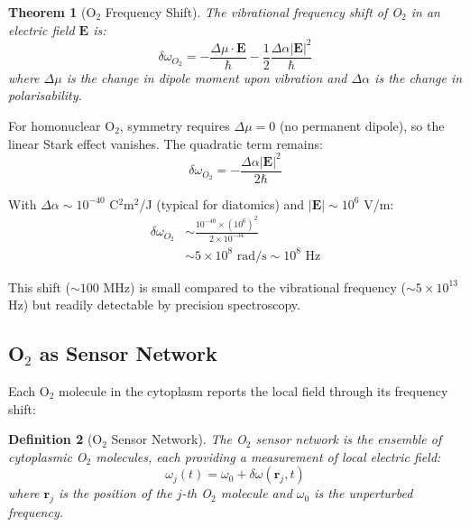\documentclass[twocolumn,10pt,aps,prd,superscriptaddress,floatfix,nofootinbib]{revtex4-2}
\newtheorem{theorem}{Theorem}[section]
\newtheorem{definition}[theorem]{Definition}
\theoremstyle{remark}
\begin{document}
\begin{theorem}[O$_2$ Frequency Shift]
\label{thm:O2_shift}
The vibrational frequency shift of O$_2$ in an electric field $\mathbf{E}$ is:
\begin{equation}
\delta\omega_{O_2} = -\frac{\Delta\mu \cdot \mathbf{E}}{\hbar} - \frac{1}{2}\frac{\Delta\alpha |\mathbf{E}|^2}{\hbar}
\label{eq:stark_shift}
\end{equation}
where $\Delta\mu$ is the change in dipole moment upon vibration and $\Delta\alpha$ is the change in polarisability.
\end{theorem}

For homonuclear O$_2$, symmetry requires $\Delta\mu = 0$ (no permanent dipole), so the linear Stark effect vanishes. The quadratic term remains:
\begin{equation}
\delta\omega_{O_2} = -\frac{\Delta\alpha |\mathbf{E}|^2}{2\hbar}
\label{eq:quadratic_stark}
\end{equation}

With $\Delta\alpha \sim 10^{-40}$ C$^2$m$^2$/J (typical for diatomics) and $|\mathbf{E}| \sim 10^{6}$ V/m:
\begin{align}
\delta\omega_{O_2} &\sim \frac{10^{-40} \times (10^{6})^2}{2 \times 10^{-34}} \nonumber \\
&\sim 5 \times 10^{8} \text{ rad/s} \sim 10^{8} \text{ Hz}
\end{align}

This shift ($\sim 100$ MHz) is small compared to the vibrational frequency ($\sim 5 \times 10^{13}$ Hz) but readily detectable by precision spectroscopy.

\subsection{O$_2$ as Sensor Network}

Each O$_2$ molecule in the cytoplasm reports the local field through its frequency shift:

\begin{definition}[O$_2$ Sensor Network]
\label{def:O2_network}
The O$_2$ sensor network is the ensemble of cytoplasmic O$_2$ molecules, each providing a measurement of local electric field:
\begin{equation}
\omega_j(t) = \omega_0 + \delta\omega(\mathbf{r}_j, t)
\end{equation}
where $\mathbf{r}_j$ is the position of the $j$-th O$_2$ molecule and $\omega_0$ is the unperturbed frequency.
\end{definition}
\end{document}
